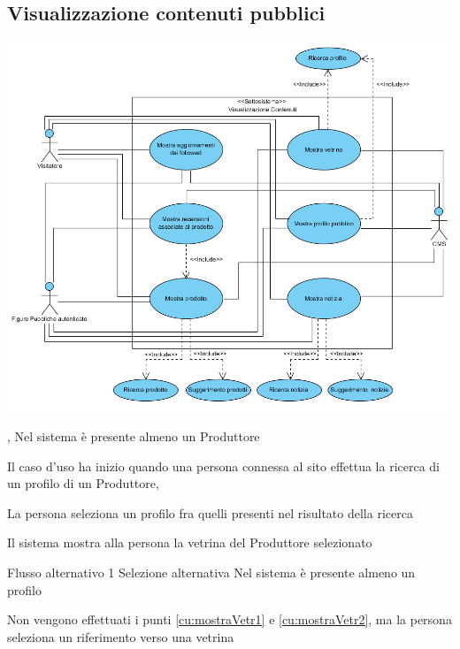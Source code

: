 \subsection{Visualizzazione contenuti pubblici}
\begin{center}
   \includegraphics[width=\textwidth]{assets/visualParadigm/cu/Visualizzazione}
\end{center}
{, }
{Nel sistema è presente almeno un Produttore}
{\postNulle}
{\begin{enumCU}
	\item Il caso d'uso ha inizio quando una persona connessa al sito effettua la ricerca di un profilo di un Produttore, \label{cu:mostraVetr1}
	\item La persona seleziona un profilo fra quelli presenti nel risultato della ricerca\label{cu:mostraVetr2}
	\item Il sistema mostra alla persona la vetrina del Produttore selezionato
\end{enumCU}}
%
%
{Flusso alternativo 1}%
{Selezione alternativa}%
{Nel sistema è presente almeno un profilo}%
{\postNulle}%
{\begin{enumCU}
	\item Non vengono effettuati i punti \ref{cu:mostraVetr1} e \ref{cu:mostraVetr2}, ma la persona seleziona un \gls{riferimento} verso una vetrina
\end{enumCU}}%
